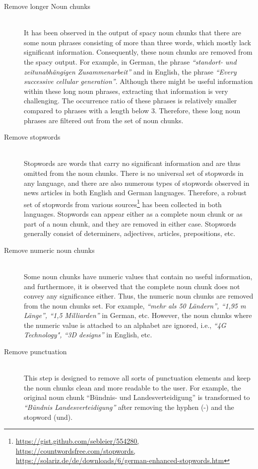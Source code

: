  
 \begin{description}
 	\item[Remove longer Noun chunks] \hfill \\  It has been observed in the output of spacy noun chunks that there are some  noun phrases consisting of more than three words, which mostly lack significant information. Consequently, these noun chunks are removed from the spacy output. For example, in German, the phrase \emph{``standort- und zeitunabhängigen Zusammenarbeit''} and in English, the phrase \emph{``Every successive cellular generation''}. Although there might be useful information within these long noun phrases, extracting that information is very challenging. The occurrence ratio of these phrases is relatively smaller compared to phrases with a length below 3. Therefore, these long noun phrases are filtered out from the set of noun chunks.
 	
 	\item[Remove stopwords] \hfill \\  Stopwords are words that carry no significant information and are thus omitted from the noun chunks. There is no universal set of stopwords in any language, and there are also numerous types of stopwords observed in news articles in both English and German languages. Therefore, a robust set of stopwords from various sources\footnote{\url{https://gist.github.com/sebleier/554280, https://countwordsfree.com/stopwords, https://solariz.de/de/downloads/6/german-enhanced-stopwords.htm}} has been collected in both languages. Stopwords can appear either as a complete noun chunk or as part of a noun chunk, and they are removed in either case. Stopwords generally consist of determiners, adjectives, articles, prepositions, etc.
 	
 	
 	\item[Remove numeric noun chunks] \hfill \\  Some noun chunks have numeric values that contain no useful information, and furthermore, it is observed that the complete noun chunk does not convey any significance either. Thus, the numeric noun chunks are removed from the noun chunks set. For example, \emph{``mehr als 50 Ländern'', ``1,95 m Länge'', ``1,5 Milliarden''} in German, etc. However, the noun chunks where the numeric value is attached to an alphabet are ignored, i.e., \emph{``4G Technology", ``3D designs''} in English, etc.
 	
 	
 	\item[Remove punctuation]  \hfill \\ This step is designed to remove all sorts of punctuation elements and keep the noun chunks clean and more readable to the user. For example, the original noun chunk ``Bündnis- und Landesverteidigung'' is transformed to \emph{``Bündnis Landesverteidigung''} after removing the hyphen (-) and the stopword (und).
 	

\end{description}
